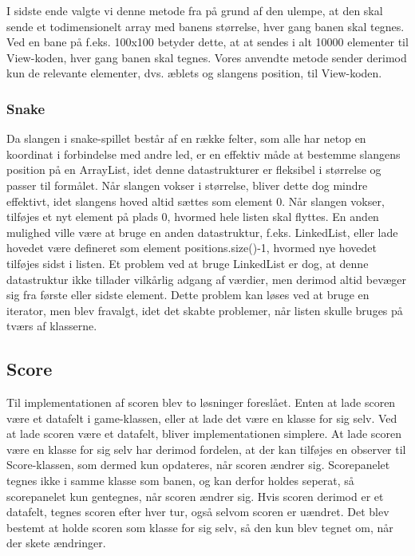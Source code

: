 I sidste ende valgte vi denne metode fra på grund af den ulempe, at den skal sende et todimensionelt array med banens størrelse, hver gang banen skal tegnes. Ved en bane på f.eks. 100x100 betyder dette, at at sendes i alt 10000 elementer til View-koden, hver gang banen skal tegnes. Vores anvendte metode sender derimod kun de relevante elementer, dvs. æblets og slangens position, til View-koden.

\subsubsection{Snake}
Da slangen i snake-spillet består af en række felter, som alle har netop en koordinat i forbindelse med andre led, er en effektiv måde at bestemme slangens position på en ArrayList, idet denne datastrukturer er fleksibel i størrelse og passer til formålet. Når slangen vokser i størrelse, bliver dette dog mindre effektivt, idet slangens hoved altid sættes som element 0. Når slangen vokser, tilføjes et nyt element på plads 0, hvormed hele listen skal flyttes. En anden mulighed ville være at bruge en anden datastruktur, f.eks. LinkedList, eller lade hovedet være defineret som element positions.size()-1, hvormed nye hovedet tilføjes sidst i listen. Et problem ved at bruge LinkedList er dog, at denne datastruktur ikke tillader vilkårlig adgang af værdier, men derimod altid bevæger sig fra første eller sidste element. Dette problem kan løses ved at bruge en iterator, men blev fravalgt, idet det skabte problemer, når listen skulle bruges på tværs af klasserne.

\subsection{Score}
Til implementationen af scoren blev to løsninger foreslået. Enten at lade scoren være et datafelt i game-klassen, eller at lade det være en klasse for sig selv. Ved at lade scoren være et datafelt, bliver implementationen simplere. At lade scoren være en klasse for sig selv har derimod fordelen, at der kan tilføjes en observer til Score-klassen, som dermed kun opdateres, når scoren ændrer sig. Scorepanelet tegnes ikke i samme klasse som banen, og kan derfor holdes seperat, så scorepanelet kun gentegnes, når scoren ændrer sig. Hvis scoren derimod er et datafelt, tegnes scoren efter hver tur, også selvom scoren er uændret. Det blev bestemt at holde scoren som klasse for sig selv, så den kun blev tegnet om, når der skete ændringer. 


